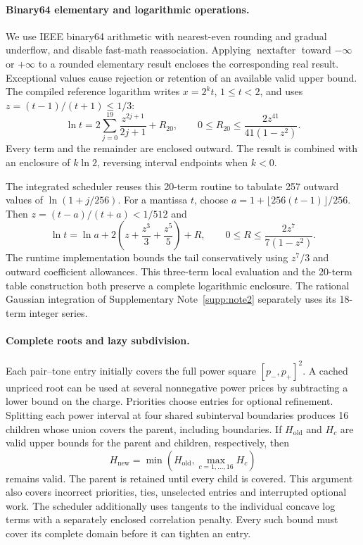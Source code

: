 \paragraph{Binary64 elementary and logarithmic operations.}
We use IEEE binary64 arithmetic with nearest-even rounding and gradual underflow, and disable fast-math reassociation. Applying \(\operatorname{nextafter}\) toward \(-\infty\) or \(+\infty\) to a rounded elementary result encloses the corresponding real result. Exceptional values cause rejection or retention of an available valid upper bound. The compiled reference logarithm writes \(x=2^k t\), \(1\leq t<2\), and uses \(z=(t-1)/(t+1)\leq1/3\):
\begin{equation}
 \ln t=2\sum_{j=0}^{19}\frac{z^{2j+1}}{2j+1}+R_{20},
 \qquad
 0\leq R_{20}\leq\frac{2z^{41}}{41(1-z^2)}.
 \label{supp:eq:binarylog}
\end{equation}
Every term and the remainder are enclosed outward. The result is combined with an enclosure of \(k\ln2\), reversing interval endpoints when \(k<0\).

The integrated scheduler reuses this 20-term routine to tabulate 257 outward values of \(\ln(1+j/256)\). For a mantissa \(t\), choose \(a=1+\lfloor256(t-1)\rfloor/256\). Then \(z=(t-a)/(t+a)<1/512\) and
\[
 \ln t=\ln a+2\left(z+\frac{z^3}{3}+\frac{z^5}{5}\right)+R,
 \qquad 0\leq R\leq\frac{2z^7}{7(1-z^2)}.
\]
The runtime implementation bounds the tail conservatively using \(z^7/3\) and outward coefficient allowances. This three-term local evaluation and the 20-term table construction both preserve a complete logarithmic enclosure. The rational Gaussian integration of Supplementary Note~\ref{supp:note2} separately uses its 18-term integer series.

\paragraph{Complete roots and lazy subdivision.}
Each pair--tone entry initially covers the full power square \([p_-,p_+]^2\). A cached unpriced root can be used at several nonnegative power prices by subtracting a lower bound on the charge. Priorities choose entries for optional refinement. Splitting each power interval at four shared subinterval boundaries produces 16 children whose union covers the parent, including boundaries. If \(H_{\mathrm{old}}\) and \(H_c\) are valid upper bounds for the parent and children, respectively, then
\begin{equation}
 H_{\mathrm{new}}=\min\!\left(H_{\mathrm{old}},\max_{c=1,\ldots,16}H_c\right)
 \label{supp:eq:lazyroot}
\end{equation}
remains valid. The parent is retained until every child is covered. This argument also covers incorrect priorities, ties, unselected entries and interrupted optional work. The scheduler additionally uses tangents to the individual concave log terms with a separately enclosed correlation penalty. Every such bound must cover its complete domain before it can tighten an entry.

